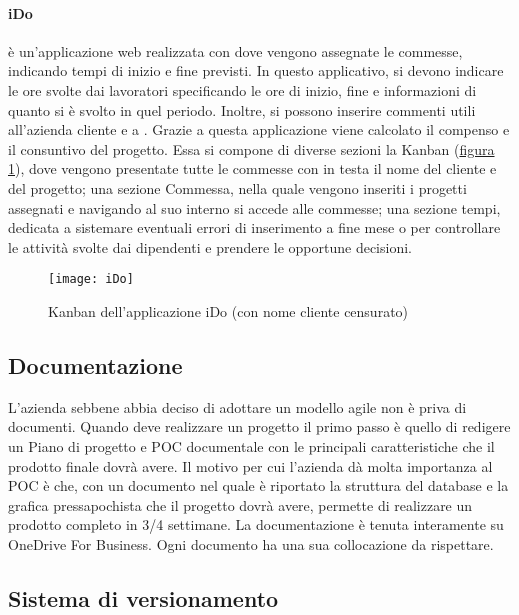 \paragraph{iDo} è un'applicazione web realizzata con \inde dove vengono assegnate le commesse, indicando tempi di inizio e fine previsti. In questo applicativo, si devono indicare le ore svolte dai lavoratori specificando le ore di inizio, fine e informazioni di quanto si è svolto in quel periodo. Inoltre, si possono inserire commenti utili all'azienda cliente e a \azienda. 
Grazie a questa applicazione viene calcolato il compenso e il consuntivo del progetto. Essa si compone di diverse sezioni la Kanban (\hyperref[ido]{figura \ref{ido}}), dove vengono presentate tutte le commesse con in testa il nome del cliente e del progetto; una sezione Commessa, nella quale vengono inseriti i progetti assegnati e navigando al suo interno si accede alle commesse; una sezione tempi, dedicata a sistemare eventuali errori di inserimento a fine mese o per controllare le attività svolte dai dipendenti e prendere le opportune decisioni.

\begin{figure}[!h] 
	\centering 
	\texttt{[image: iDo]} 
	\caption{Kanban dell'applicazione iDo (con nome cliente censurato)}
	\label{ido}
\end{figure}



\subsection{Documentazione}
\label{cap1:Documentazione}

L'azienda sebbene abbia deciso di adottare un modello agile non è priva di documenti. Quando deve realizzare un progetto il primo passo è quello di redigere un Piano di progetto e POC documentale con le principali caratteristiche che il prodotto finale dovrà avere. 
Il motivo per cui l'azienda dà molta importanza al POC è che, con un documento nel quale è riportato la struttura del database e la grafica pressapochista che il progetto dovrà avere, permette di realizzare un prodotto completo in 3/4 settimane. 
La documentazione è tenuta interamente su OneDrive For Business. Ogni documento ha una sua collocazione da rispettare. 

\subsection{Sistema di versionamento}
\label{cap1:Sistema di versionamento}

